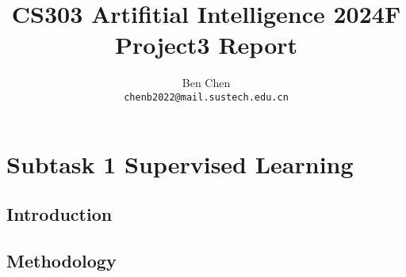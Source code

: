 \documentclass{article}
\title{\textbf{CS303 Artifitial Intelligence 2024F Project3 Report}}
\author{Ben Chen \\ \texttt{chenb2022@mail.sustech.edu.cn}}
\begin{document}
\maketitle

\section{Subtask 1 Supervised Learning}

\subsection{Introduction}

\subsection{Methodology}
\end{document}
